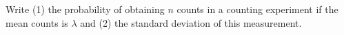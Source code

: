 

\vspace*{\fill}
\centering

Write (1) the probability of obtaining $n$ counts in a counting experiment if the mean counts is $\lambda$ and (2) the standard deviation of this measurement.

\centering
\vspace*{\fill}

